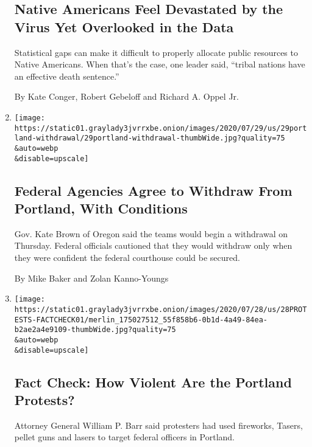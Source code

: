 \begin{enumerate}
{  \subsection{Native Americans Feel Devastated by the Virus Yet
  Overlooked in the
  Data}\label{native-americans-feel-devastated-by-the-virus-yet-overlooked-in-the-data}}

  Statistical gaps can make it difficult to properly allocate public
  resources to Native Americans. When that's the case, one leader said,
  ``tribal nations have an effective death sentence.''

  By Kate Conger, Robert Gebeloff and Richard A. Oppel Jr.
\item
  \href{/2020/07/29/us/protests-portland-federal-withdrawal.html}{}

  \texttt{[image: https://static01.graylady3jvrrxbe.onion/images/2020/07/29/us/29portland-withdrawal/29portland-withdrawal-thumbWide.jpg?quality=75\\\&auto=webp\\\&disable=upscale]}

  \hypertarget{federal-agencies-agree-to-withdraw-from-portland-with-conditions}{%
  \subsection{Federal Agencies Agree to Withdraw From Portland, With
  Conditions}\label{federal-agencies-agree-to-withdraw-from-portland-with-conditions}}

  Gov. Kate Brown of Oregon said the teams would begin a withdrawal on
  Thursday. Federal officials cautioned that they would withdraw only
  when they were confident the federal courthouse could be secured.

  By Mike Baker and Zolan Kanno-Youngs
\item
  \href{/2020/07/28/us/portland-protests-fact-check.html}{}

  \texttt{[image: https://static01.graylady3jvrrxbe.onion/images/2020/07/28/us/28PROTESTS-FACTCHECK01/merlin\_175027512\_55f858b6-0b1d-4a49-84ea-b2ae2a4e9109-thumbWide.jpg?quality=75\\\&auto=webp\\\&disable=upscale]}

  \hypertarget{fact-check-how-violent-are-the-portland-protests}{%
  \subsection{Fact Check: How Violent Are the Portland
  Protests?}\label{fact-check-how-violent-are-the-portland-protests}}

  Attorney General William P. Barr said protesters had used fireworks,
  Tasers, pellet guns and lasers to target federal officers in Portland.


\end{enumerate}
